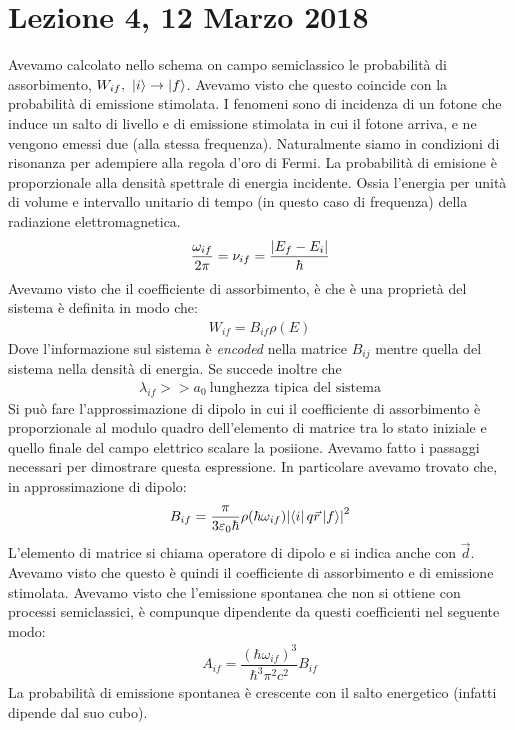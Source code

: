 \documentclass[10pt, a4paper]{article}
\begin{document}
	\section{Lezione 4, 12 Marzo 2018}
	
	Avevamo calcolato nello schema on campo semiclassico le probabilità di assorbimento, $ W_{if},\ \ket{i}\to\ket{f} $. Avevamo visto che questo coincide con la probabilità di emissione stimolata. I fenomeni sono di incidenza di un fotone che induce un salto di livello e di emissione stimolata in cui il fotone arriva, e ne vengono emessi due (alla stessa frequenza). Naturalmente siamo in condizioni di risonanza per adempiere alla regola d'oro di Fermi. La probabilità di emisione è proporzionale alla densità spettrale di energia incidente. Ossia l'energia per unità di volume e intervallo unitario di tempo (in questo caso di frequenza) della radiazione elettromagnetica. 
	\begin{gather*}
	\dfrac{\omega_{if}}{2\pi}=\nu_{if}=\dfrac{\abs{E_{f}-E_{i}}}{\hbar}
	\end{gather*}
	Avevamo visto che il coefficiente di assorbimento, è che è una proprietà del sistema è definita in modo che:
	\begin{gather*}
	W_{if}=B_{if}\rho(E)
	\end{gather*}
	Dove l'informazione sul sistema è \emph{encoded} nella matrice $ B_{ij} $ mentre quella del sistema nella densità di energia. Se succede inoltre che 
	\begin{gather*}
	\lambda_{if}>>a_{0}\ \text{lunghezza tipica del sistema}
	\end{gather*}
	Si può fare l'approssimazione di dipolo in cui il coefficiente di assorbimento è proporzionale al modulo quadro dell'elemento di matrice tra lo stato iniziale e quello finale del campo elettrico  scalare la posiione. Avevamo fatto i passaggi necessari per dimostrare questa espressione. In particolare avevamo trovato che, in approssimazione di dipolo:
	\begin{gather*}
	B_{if}=\dfrac{\pi}{3\varepsilon_{0}\hbar}\rho(\hbar\omega_{if})\abs{\bra{i}q\vec{r}\ket{f}}^{2}
	\end{gather*}
	L'elemento di matrice si chiama operatore di dipolo e si indica anche con $ \vec{d} $. Avevamo visto che questo è quindi il coefficiente di assorbimento e di emissione stimolata. Avevamo visto che l'emissione spontanea che non si ottiene con processi semiclassici, è compunque dipendente da questi coefficienti nel seguente modo:
	\begin{gather*}
	A_{if}=\dfrac{\left(\hbar\omega_{if}\right)^{3}}{\hbar^{3}\pi^{2}c^{2}}B_{if}
	\end{gather*}
	La probabilità di emissione spontanea è crescente con il salto energetico (infatti dipende dal suo cubo).
	
\end{document}
